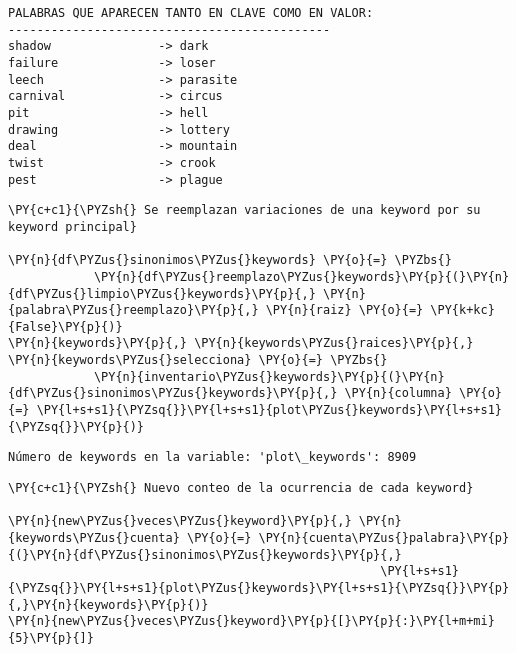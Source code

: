     \begin{Verbatim}[commandchars=\\\{\}]
PALABRAS QUE APARECEN TANTO EN CLAVE COMO EN VALOR:
---------------------------------------------
shadow               -> dark
failure              -> loser
leech                -> parasite
carnival             -> circus
pit                  -> hell
drawing              -> lottery
deal                 -> mountain
twist                -> crook
pest                 -> plague
    \end{Verbatim}

    \begin{tcolorbox}[breakable, size=fbox, boxrule=1pt, pad at break*=1mm,colback=cellbackground, colframe=cellborder]
\begin{Verbatim}[commandchars=\\\{\}]
\PY{c+c1}{\PYZsh{} Se reemplazan variaciones de una keyword por su keyword principal}

\PY{n}{df\PYZus{}sinonimos\PYZus{}keywords} \PY{o}{=} \PYZbs{}
            \PY{n}{df\PYZus{}reemplazo\PYZus{}keywords}\PY{p}{(}\PY{n}{df\PYZus{}limpio\PYZus{}keywords}\PY{p}{,} \PY{n}{palabra\PYZus{}reemplazo}\PY{p}{,} \PY{n}{raiz} \PY{o}{=} \PY{k+kc}{False}\PY{p}{)}   
\PY{n}{keywords}\PY{p}{,} \PY{n}{keywords\PYZus{}raices}\PY{p}{,} \PY{n}{keywords\PYZus{}selecciona} \PY{o}{=} \PYZbs{}
            \PY{n}{inventario\PYZus{}keywords}\PY{p}{(}\PY{n}{df\PYZus{}sinonimos\PYZus{}keywords}\PY{p}{,} \PY{n}{columna} \PY{o}{=} \PY{l+s+s1}{\PYZsq{}}\PY{l+s+s1}{plot\PYZus{}keywords}\PY{l+s+s1}{\PYZsq{}}\PY{p}{)}
\end{Verbatim}
\end{tcolorbox}

    \begin{Verbatim}[commandchars=\\\{\}]
Número de keywords en la variable: 'plot\_keywords': 8909
    \end{Verbatim}

    \begin{tcolorbox}[breakable, size=fbox, boxrule=1pt, pad at break*=1mm,colback=cellbackground, colframe=cellborder]
\begin{Verbatim}[commandchars=\\\{\}]
\PY{c+c1}{\PYZsh{} Nuevo conteo de la ocurrencia de cada keyword}

\PY{n}{new\PYZus{}veces\PYZus{}keyword}\PY{p}{,} \PY{n}{keywords\PYZus{}cuenta} \PY{o}{=} \PY{n}{cuenta\PYZus{}palabra}\PY{p}{(}\PY{n}{df\PYZus{}sinonimos\PYZus{}keywords}\PY{p}{,}
                                                    \PY{l+s+s1}{\PYZsq{}}\PY{l+s+s1}{plot\PYZus{}keywords}\PY{l+s+s1}{\PYZsq{}}\PY{p}{,}\PY{n}{keywords}\PY{p}{)}
\PY{n}{new\PYZus{}veces\PYZus{}keyword}\PY{p}{[}\PY{p}{:}\PY{l+m+mi}{5}\PY{p}{]}
\end{Verbatim}
\end{tcolorbox}

